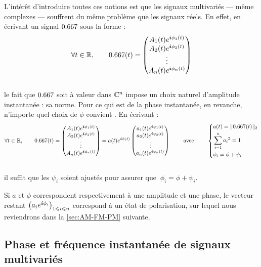 L'intérêt d'introduire toutes ces notions est que les signaux multivariés --- même complexes --- souffrent du même problème que les signaux réels. 
En effet, en écrivant un signal $\x$ sous la forme :
\[\forall t\in\R,\qquad 
\x(t) = \begin{pmatrix} A_1(t)e^{\i \phi_1(t)} \\ A_2(t)e^{\i \phi_2(t)} \\ \vdots \\ A_n(t)e^{\i \phi_n(t)}
\end{pmatrix}\]
\\
le fait que $\x$ soit à valeur dans $\mathbb{C}^n$ impose un choix naturel d'amplitude instantanée : sa norme. Pour ce qui est de la phase instantanée, en revanche, n'importe quel choix de $\phi$ convient \apriori. En écrivant :
\[\forall t\in\R,\qquad 
\x(t) = \begin{pmatrix} A_1(t)e^{\i \phi_1(t)} \\ A_2(t)e^{\i \phi_2(t)} \\ \vdots \\ A_n(t)e^{\i \phi_n(t)} \end{pmatrix}
= a(t)e^{\i \phi(t)}\begin{pmatrix} a_1(t)e^{\i \psi_1(t)} \\ a_2(t)e^{\i \psi_2(t)} \\ \vdots \\ a_n(t)e^{\i \psi_n(t)} \end{pmatrix}
\qquad\text{ avec }\qquad 
\left\{ \begin{aligned}
	& a(t) = \| \x(t) \|_2 \\
	& \sum_{i=1}^n {a_i}^2 = 1 \\
	& \phi_i = \phi + \psi_i \end{aligned}\right.\]
\\
il suffit que les $\psi_i$ soient ajustés pour assurer que $\ \phi_i = \phi + \psi_i$.
\\
\begin{remarque}
	Si $a$ et $\phi$ correspondent respectivement à une amplitude et une phase, le vecteur restant $\big( a_ie^{\boldsymbol{i} \phi_i} \big)_{1\leqslant i\leqslant n}$ correspond à un état de polarisation, sur lequel nous reviendrons dans la \cref{sec:AM-FM-PM} suivante.
\end{remarque}
\skipl




\subsection{Phase et fréquence instantanée de signaux multivariés} \label{subsec:intro_phased}


